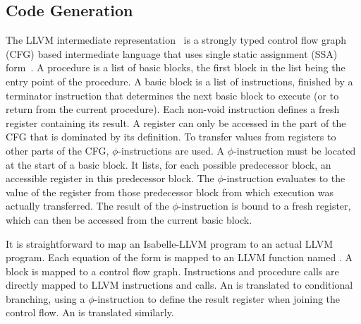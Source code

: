\documentclass[a4paper,USenglish,cleveref, autoref]{lipics-v2019}
\begin{document}
\subsection{Code Generation}
The LLVM intermediate representation~\cite{LLVM-manual} is a strongly typed control flow graph (CFG) based intermediate language 
that uses single static assignment (SSA) form~\cite{CFRWZ91}.
A procedure is a list of basic blocks, the first block in the list being the entry point of the procedure. 
A basic block is a list of instructions, finished by a terminator instruction that determines the next basic block to execute (or to return from the current procedure).
Each non-void instruction defines a fresh register containing its result. A register can only be accessed in the part of the CFG that is dominated by its definition.
To transfer values from registers to other parts of the CFG, $\phi$-instructions are used. 
A $\phi$-instruction must be located at the start of a basic block. 
It lists, for each possible predecessor block, an accessible register in this predecessor block. 
The $\phi$-instruction evaluates to the value of the register from those predecessor block from which execution was actually transferred. 
The result of the $\phi$-instruction is bound to a fresh register, which can then be accessed from the current basic block.


It is straightforward to map an Isabelle-LLVM program to an actual LLVM program.
Each equation of the form  is mapped to an LLVM function named . 
A block is mapped to a control flow graph. Instructions and procedure calls are directly mapped to LLVM instructions and calls.
An  is translated to conditional branching, using a $\phi$-instruction to define the result register  when joining the control flow.
An  is translated similarly. 
\end{document}
